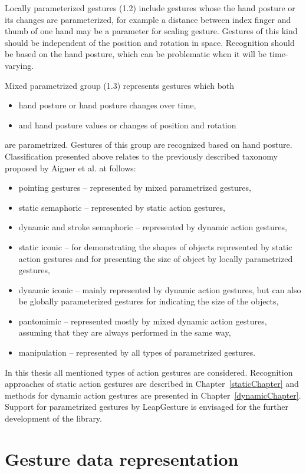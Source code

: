 Locally parameterized gestures (1.2) include gestures whose the hand posture or its changes are parameterized, for example a distance between index finger and thumb of one hand may be a parameter for scaling gesture. Gestures of this kind should be independent of the position and rotation in space. Recognition should be based on the hand posture, which can be problematic when it will be time-varying.

Mixed parametrized group (1.3) represents gestures which both
\begin{itemize}
\item hand posture or hand posture changes over time,
\item and hand posture values or changes of position and rotation
\end{itemize}
are parametrized. Gestures of this group are recognized based on hand posture.
Classification presented above relates to the previously described taxonomy proposed by Aigner et al. at follows:
\begin{itemize}
\item pointing gestures -- represented by mixed parametrized gestures,
\item static semaphoric -- represented by static action gestures,
\item dynamic and stroke semaphoric -- represented by dynamic action gestures,
\item static iconic -- for demonstrating the shapes of objects represented by static action gestures and for presenting the size of object by locally parametrized gestures,
\item dynamic iconic -- mainly represented by dynamic action gestures, but can also be globally parameterized gestures for indicating the size of the objects,
\item pantomimic -- represented mostly by mixed dynamic action gestures, assuming that they are always performed in the same way,
\item manipulation -- represented by all types of parametrized gestures.
\end{itemize}

In this thesis all mentioned types of action gestures are considered. Recognition approaches of static action gestures are described in Chapter~\ref{staticChapter} and methods for dynamic action gestures are presented in Chapter~\ref{dynamicChapter}. Support for parametrized gestures by LeapGesture is envisaged for the further development of the library.

\section{Gesture data representation} \label{datarepSection}

